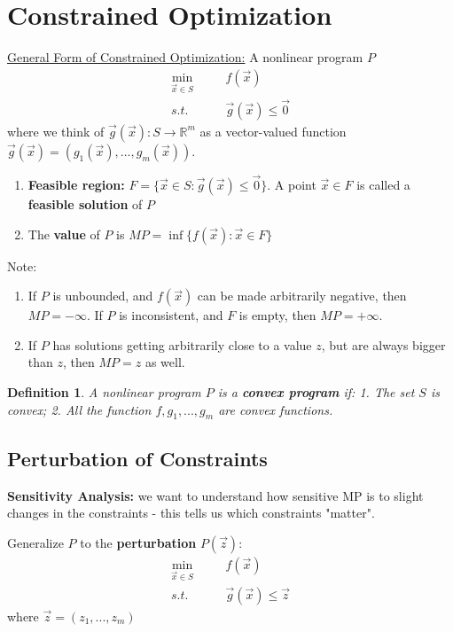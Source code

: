 \documentclass[11pt,a4paper]{article}
\newtheorem{definition}{Definition}
\begin{document}
\section{Constrained Optimization}
\underline{General Form of Constrained Optimization:} A nonlinear program $P$
\begin{equation}
    \begin{aligned}
        \min_{\vec{x}\in S}&\quad &f(\vec{x})\\
        s.t.& &\vec{g}(\vec{x})\leq \vec{0}
    \end{aligned}
    \nonumber
\end{equation}
where we think of $\vec{g}(\vec{x}): S \rightarrow \mathbb{R}^m$ as a vector-valued function $\vec{g}(\vec{x})=\left(g_1(\vec{x}),...,g_m(\vec{x})\right)$.
\begin{enumerate}
    \item \textbf{Feasible region:} $F=\{\vec{x}\in S: \vec{g}(\vec{x})\leq \vec{0}\}$. A point $\vec{x}\in F$ is called a \textbf{feasible solution} of $P$
    \item The \textbf{value} of $P$ is $MP=\inf\{f(\vec{x}): \vec{x}\in F\}$
\end{enumerate}
Note:
\begin{enumerate}[$\bullet$]
    \item If $P$ is unbounded, and $f(\vec{x})$ can be made arbitrarily negative, then $MP = -\infty$. If $P$ is inconsistent, and $F$ is empty, then $MP = +\infty$.
    \item If $P$ has solutions getting arbitrarily close to a value $z$, but are always bigger than $z$, then $MP =z$ as well.
\end{enumerate}

\begin{definition}
    A nonlinear program $P$ is a \textbf{convex program} if: 1. The set $S$ is convex; 2. All the function $f,g_1,...,g_m$ are convex functions.
\end{definition}

\subsection{Perturbation of Constraints}
\textbf{Sensitivity Analysis:} we want to understand how sensitive MP is to slight changes in the constraints - this tells us which constraints "matter".

Generalize $P$ to the \textbf{perturbation} $P(\vec{z})$:
\begin{equation}
    \begin{aligned}
        \min_{\vec{x}\in S}&\quad &f(\vec{x})\\
        s.t.& &\vec{g}(\vec{x})\leq \vec{z}
    \end{aligned}
    \nonumber
\end{equation}
where $\vec{z}=(z_1,...,z_m)$
\end{document}
